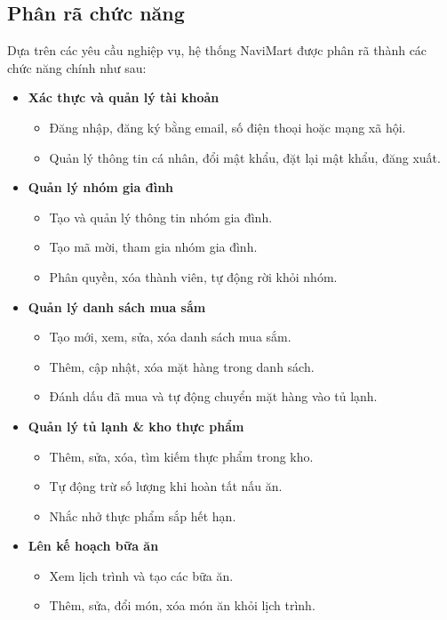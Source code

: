 \documentclass[../main.tex]{subfiles}
\begin{document}
\subsection{Phân rã chức năng}
Dựa trên các yêu cầu nghiệp vụ, hệ thống NaviMart được phân rã thành các chức năng chính như sau:

\begin{itemize}
    \item \textbf{Xác thực và quản lý tài khoản}
    \begin{itemize}
        \item Đăng nhập, đăng ký bằng email, số điện thoại hoặc mạng xã hội.
        \item Quản lý thông tin cá nhân, đổi mật khẩu, đặt lại mật khẩu, đăng xuất.
    \end{itemize}
    \item \textbf{Quản lý nhóm gia đình}
    \begin{itemize}
        \item Tạo và quản lý thông tin nhóm gia đình.
        \item Tạo mã mời, tham gia nhóm gia đình.
        \item Phân quyền, xóa thành viên, tự động rời khỏi nhóm.
    \end{itemize}
    \item \textbf{Quản lý danh sách mua sắm}
    \begin{itemize}
        \item Tạo mới, xem, sửa, xóa danh sách mua sắm.
        \item Thêm, cập nhật, xóa mặt hàng trong danh sách.
        \item Đánh dấu đã mua và tự động chuyển mặt hàng vào tủ lạnh.
    \end{itemize}
    \item \textbf{Quản lý tủ lạnh \& kho thực phẩm}
    \begin{itemize}
        \item Thêm, sửa, xóa, tìm kiếm thực phẩm trong kho.
        \item Tự động trừ số lượng khi hoàn tất nấu ăn.
        \item Nhắc nhở thực phẩm sắp hết hạn.
    \end{itemize}
    \item \textbf{Lên kế hoạch bữa ăn}
    \begin{itemize}
        \item Xem lịch trình và tạo các bữa ăn.
        \item Thêm, sửa, đổi món, xóa món ăn khỏi lịch trình.

\end{itemize}
\end{itemize}
\end{document}
